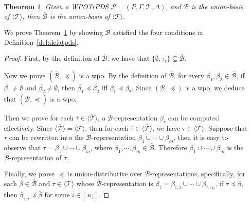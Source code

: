 \documentclass[preprint,12pt]{elsarticle}
\newtheorem{theorem}{Theorem}
\newcommand\Pp{{\mathcal{P} }}
\newcommand\TranSet{{\mathscr{T} }}
\newcommand\Tranbasis{{\mathscr{B} }}
\newcommand{\WOTrPDS}{\textsf{WPOTrPDS}}
\begin{document}
\begin{theorem}\label{thm-wstrpds-wpo}
	Given a {\WOTrPDS} $\Pp = (P, \Gamma, \TranSet, \Delta)$, and $\Tranbasis$ is the union-basis of $\langle \TranSet \rangle$, then $\overline{\Tranbasis}$ is the union-basis of $\langle \overline{\TranSet}\rangle$.
\end{theorem}
We prove Theorem~\ref{thm-wstrpds-wpo} by showing $\overline{\Tranbasis}$ satisfied the four conditions in Definition~\ref{def:defatpds}.
\begin{proof}
	First, by the definition of $\overline{\Tranbasis}$, we have that $\{\emptyset, \tau_{\epsilon}\}\subseteq \overline{\Tranbasis}$.

	Now we prove $(\overline{\Tranbasis}, \preceq)$ is a wpo. By the definition of $\overline{\Tranbasis}$, for every $\overline{\beta_1},\overline{\beta_2}\in\overline{\Tranbasis}$, if $\overline{\beta_1}\neq\emptyset$ and $\overline{\beta_2}\neq \emptyset$, then $\overline{\beta_1}\preceq\overline{\beta_2}$ iff $\beta_1\preceq\beta_2$. Since $(\Tranbasis, \preceq)$ is a wpo, we deduce that $(\overline{\Tranbasis}, \preceq)$ is a wpo.

	Then we prove for each $\overline{\tau}\in\langle\overline{\TranSet}\rangle$, a $\overline{\Tranbasis}$-representation $\beta_{\overline{\tau}}$ can be computed effectively.
	Since $\langle\overline{\TranSet}\rangle = \overline{\langle \TranSet \rangle}$, then for each $\overline{\tau}\in\langle\overline{\TranSet}\rangle$, we have $\tau \in \langle \TranSet \rangle$. 
	Suppose that $\tau$ can be rewritten into the $\Tranbasis$-representation $\beta_1\cup\cdots\cup\beta_m$, then it is easy to observe that $\overline{\tau} = \overline{\beta_1}\cup\cdots\cup\overline{\beta_m}$, where $\overline{\beta_1},\cdots,\overline{\beta_m} \in \overline{\Tranbasis}$. Therefore $\overline{\beta_1}\cup\cdots\cup\overline{\beta_m}$ is the $\overline{\Tranbasis}$-representation of $\overline{\tau}$.

	Finally, we prove $\preceq$ is union-distributive over $\overline{\Tranbasis}$-representations, specifically, for each $\overline{\beta} \in \overline{\Tranbasis}$ and $\overline{\tau} \in \langle \overline{\TranSet} \rangle$ whose $\overline{\Tranbasis}$-representation is $\beta_{\overline{\tau}}=\beta_{\overline{\tau}, 1} \cup \cdots \cup \beta_{\overline{\tau}, n_{\overline{\tau}}}$, if $\overline{\tau} \preceq \overline{\beta}$, then $ \beta_{\overline{\tau}, i} \preceq \overline{\beta}$ for some $i \in [n_{\overline{\tau}}]$.


\end{proof}
\end{document}
